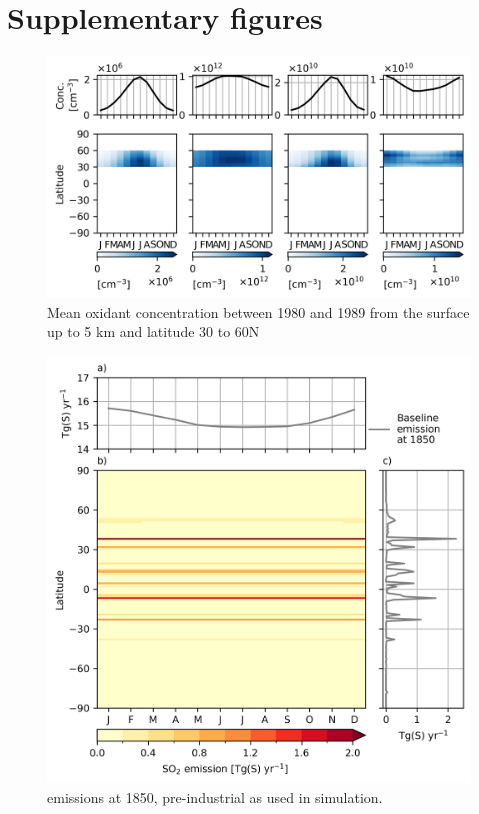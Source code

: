 \section{Supplementary figures}
\begin{figure}
    \centering
    \includegraphics{Appendix1/figs/seasonal_oxidant_1980_lat30-60.png}
    \caption{Mean oxidant concentration between 1980 and 1989 from the surface up to 5 km and latitude 30 to 60\textdegree N }
    \label{fig:app1:seasonal-oxidant-30-60}
\end{figure}

\begin{figure}
    \centering
    \includegraphics{Appendix1/figs/emiso2_monthly_1850.png}
    \caption{ emissions at 1850, pre-industrial as used in \piaer{} simulation.}
    \label{fig:app1:seasonal-emiso2-1850}
\end{figure}

